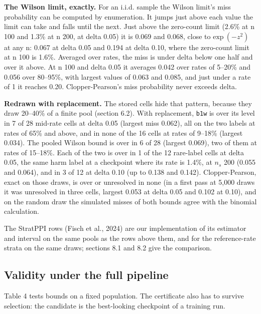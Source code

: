 \documentclass[11pt]{article}
\begin{document}
\textbf{The Wilson limit, exactly.} For an i.i.d. sample the Wilson limit's miss probability can be computed by enumeration. It jumps just above each value the limit can take and falls until the next. Just above the zero-count limit (2.6\% at n 100 and 1.3\% at n 200, at delta 0.05) it is 0.069 and 0.068, close to $\text{exp}\ (-z ^{2})$ at any n: 0.067 at delta 0.05 and 0.194 at delta 0.10, where the zero-count limit at n 100 is 1.6\%. Averaged over rates, the miss is under delta below one half and over it above. At n 100 and delta 0.05 it averages 0.042 over rates of 5--20\% and 0.056 over 80--95\%, with largest values of 0.063 and 0.085, and just under a rate of 1 it reaches 0.20. Clopper-Pearson's miss probability never exceeds delta.


\textbf{Redrawn with replacement.} The stored cells hide that pattern, because they draw 20--40\% of a finite pool (section 6.2). With replacement, \texttt{b1w} is over its level in 7 of 28 mid-rate cells at delta 0.05 (largest miss 0.062), all on the two labels at rates of 65\% and above, and in none of the 16 cells at rates of 9--18\% (largest 0.034). The pooled Wilson bound is over in 6 of 28 (largest 0.069), two of them at rates of 15--18\%. Each of the two is over in 1 of the 12 rare-label cells at delta 0.05, the same harm label at a checkpoint where its rate is 1.4\%, at $n_{s}$ 200 (0.055 and 0.064), and in 3 of 12 at delta 0.10 (up to 0.138 and 0.142). Clopper-Pearson, exact on those draws, is over or unresolved in none (in a first pass at 5,000 draws it was unresolved in three cells, largest 0.053 at delta 0.05 and 0.102 at 0.10), and on the random draw the simulated misses of both bounds agree with the binomial calculation.


The StratPPI rows (Fisch et al., 2024) are our implementation of its estimator and interval on the same pools as the rows above them, and for the reference-rate strata on the same draws; sections 8.1 and 8.2 give the comparison.


\subsection{Validity under the full pipeline}

Table 4 tests bounds on a fixed population. The certificate also has to survive selection: the candidate is the best-looking checkpoint of a training run.
\end{document}
